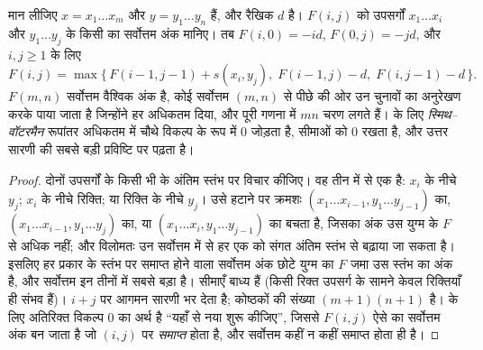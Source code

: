 \begin{theorem}[नीडलमैन--वुंश]\label{thm:b3:bioinformatics:nw}
मान लीजिए $x = x_{1}\dots x_{m}$ और $y = y_{1}\dots y_{n}$ हैं, और
रैखिक  $d$ है। $F(i,j)$ को उपसर्गों
$x_{1}\dots x_{i}$ और $y_{1}\dots y_{j}$ के किसी  का
सर्वोत्तम अंक मानिए। तब $F(i,0) = -id$, $F(0,j) = -jd$, और $i,j \ge 1$ के लिए
\[
F(i,j) = \max\bigl\{\,F(i-1,j-1) + s(x_{i},y_{j}),\;
F(i-1,j) - d,\; F(i,j-1) - d\,\bigr\}.
\]
$F(m,n)$ सर्वोत्तम वैश्विक अंक है, कोई सर्वोत्तम 
$(m,n)$ से पीछे की ओर उन चुनावों का अनुरेखण करके पाया जाता है जिन्होंने
हर अधिकतम दिया, और पूरी गणना में $mn$ चरण लगते हैं।  के
लिए \emph{स्मिथ--वॉटरमैन} रूपांतर अधिकतम में चौथे विकल्प के रूप में $0$
जोड़ता है, सीमाओं को $0$ रखता है, और उत्तर सारणी की सबसे बड़ी प्रविष्टि
पर पढ़ता है।
\end{theorem}
\begin{proof}
दोनों उपसर्गों के किसी भी  के अंतिम स्तंभ पर विचार कीजिए। वह तीन
में से एक है: $x_{i}$ के नीचे $y_{j}$; $x_{i}$ के नीचे रिक्ति; या
रिक्ति के नीचे $y_{j}$। उसे हटाने पर क्रमशः $(x_{1}\dots x_{i-1},
y_{1}\dots y_{j-1})$ का, $(x_{1}\dots x_{i-1}, y_{1}\dots y_{j})$ का, या
$(x_{1}\dots x_{i}, y_{1}\dots y_{j-1})$ का  बचता है, जिसका अंक उस
युग्म के $F$ से अधिक नहीं; और विलोमतः उन सर्वोत्तम  में से हर एक
को संगत अंतिम स्तंभ से बढ़ाया जा सकता है। इसलिए हर प्रकार के स्तंभ पर
समाप्त होने वाला सर्वोत्तम अंक छोटे युग्म का $F$ जमा उस स्तंभ का अंक
है, और सर्वोत्तम इन तीनों में सबसे बड़ा है। सीमाएँ बाध्य हैं (किसी रिक्त
उपसर्ग के सामने केवल रिक्तियाँ ही संभव हैं)।
$i + j$ पर आगमन सारणी भर देता है; कोष्ठकों की संख्या $(m+1)(n+1)$ है।
 के लिए अतिरिक्त विकल्प $0$ का अर्थ है ``यहाँ से नया
 शुरू कीजिए'', जिससे $F(i,j)$ ऐसे  का सर्वोत्तम अंक बन जाता
है जो $(i,j)$ पर \emph{समाप्त} होता है, और सर्वोत्तम  कहीं
न कहीं समाप्त होता ही है।
\end{proof}

